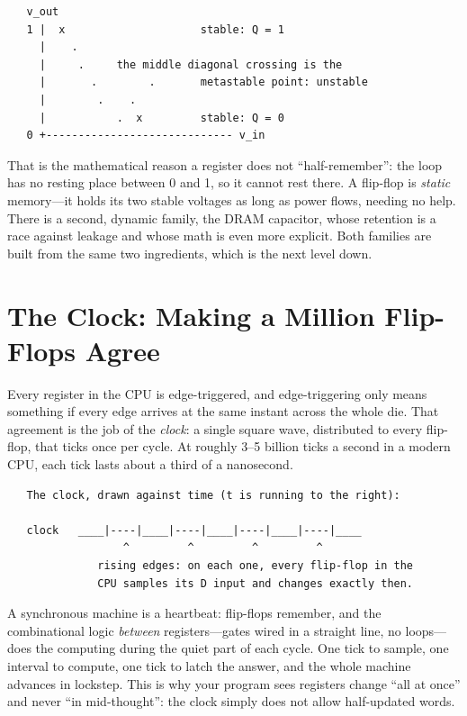 \begin{verbatim}
   v_out
   1 |  x                     stable: Q = 1
     |    .
     |     .     the middle diagonal crossing is the
     |       .        .       metastable point: unstable
     |        .    .
     |           .  x         stable: Q = 0
   0 +----------------------------- v_in
\end{verbatim}

That is the mathematical reason a register does not ``half-remember'':
the loop has no resting place between 0 and 1, so it cannot rest
there. A flip-flop is \emph{static} memory---it holds its two stable
voltages as long as power flows, needing no help. There is a second,
dynamic family, the DRAM capacitor, whose retention is a race against
leakage and whose math is even more explicit. Both families are built
from the same two ingredients, which is the next level down.

\section{The Clock: Making a Million Flip-Flops Agree}
\label{sec:clock}

Every register in the CPU is edge-triggered, and edge-triggering only
means something if every edge arrives at the same instant across the
whole die. That agreement is the job of the \emph{clock}: a single
square wave, distributed to every flip-flop, that ticks once per
cycle. At roughly 3--5 billion ticks a second in a modern CPU, each
tick lasts about a third of a nanosecond.

\begin{verbatim}
   The clock, drawn against time (t is running to the right):

   clock   ____|----|____|----|____|----|____|----|____
                  ^         ^         ^         ^
              rising edges: on each one, every flip-flop in the
              CPU samples its D input and changes exactly then.
\end{verbatim}

A synchronous machine is a heartbeat: flip-flops remember, and the
combinational logic \emph{between} registers---gates wired in a
straight line, no loops---does the computing during the quiet part of
each cycle. One tick to sample, one interval to compute, one tick to
latch the answer, and the whole machine advances in lockstep. This is
why your program sees registers change ``all at once'' and never
``in mid-thought'': the clock simply does not allow half-updated
words.


